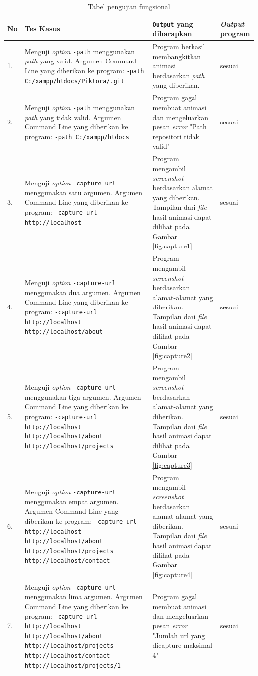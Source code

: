 \begin{table}[htbp]
	\centering
	\caption{Tabel pengujian fungsional}
	
		\begin{tabular}{|p{0.3cm}|>{\raggedright} p{5.5 cm}| p{7 cm}| p{3 cm}|} \hline
		No & Tes Kasus	& \texttt{Output} yang diharapkan & \textit{Output} program \\ \hline
		1. & Menguji \textit{option} \texttt{-path} menggunakan \textit{path} yang valid. Argumen Command Line yang diberikan ke program: \texttt{-path C:/xampp/htdocs/Piktora/.git} & Program berhasil membangkitkan animasi berdasarkan \textit{path} yang diberikan.& sesuai \\ \hline
		2. & Menguji \textit{option} \texttt{-path} menggunakan \textit{path} yang tidak valid. Argumen Command Line yang diberikan ke program: \texttt{-path C:/xampp/htdocs}  & Program gagal membuat animasi dan mengeluarkan pesan \textit{error} "Path repositori tidak valid"  & sesuai \\ \hline
		3. & Menguji \textit{option} \texttt{-capture-url} menggunakan satu argumen. Argumen Command Line yang diberikan ke program:  \texttt{-capture-url http://localhost} & Program mengambil \textit{screenshot} berdasarkan alamat yang diberikan. Tampilan dari \textit{file} hasil animasi dapat dilihat pada Gambar \ref{fig:capture1}  & sesuai	\\ \hline
		4. & Menguji \textit{option} \texttt{-capture-url} menggunakan dua argumen. Argumen Command Line yang diberikan ke program:  \texttt{-capture-url http://localhost http://localhost/about} & Program mengambil \textit{screenshot} berdasarkan alamat-alamat yang diberikan. Tampilan dari \textit{file} hasil animasi dapat dilihat pada Gambar \ref{fig:capture2}  & sesuai \\ \hline
		5. & Menguji \textit{option} \texttt{-capture-url} menggunakan tiga argumen. Argumen Command Line yang diberikan ke program:  \texttt{-capture-url http://localhost http://localhost/about http://localhost/projects} & Program mengambil \textit{screenshot} berdasarkan alamat-alamat yang diberikan. Tampilan dari \textit{file} hasil animasi dapat dilihat pada Gambar \ref{fig:capture3}   & sesuai\\ \hline
		6. & Menguji \textit{option} \texttt{-capture-url} menggunakan empat argumen. Argumen Command Line yang diberikan ke program:  \texttt{-capture-url http://localhost http://localhost/about http://localhost/projects http://localhost/contact} & Program mengambil \textit{screenshot} berdasarkan alamat-alamat yang diberikan. Tampilan dari \textit{file} hasil animasi dapat dilihat pada Gambar \ref{fig:capture4}  & sesuai \\ \hline
		7. & Menguji \textit{option} \texttt{-capture-url} menggunakan lima argumen. Argumen Command Line yang diberikan ke program:  \texttt{-capture-url http://localhost http://localhost/about http://localhost/projects http://localhost/contact http://localhost/projects/1}& Program gagal membuat animasi dan mengeluarkan pesan \textit{error} "Jumlah url yang dicapture maksimal 4" & sesuai \\ \hline
		

\end{tabular}
\end{table}
